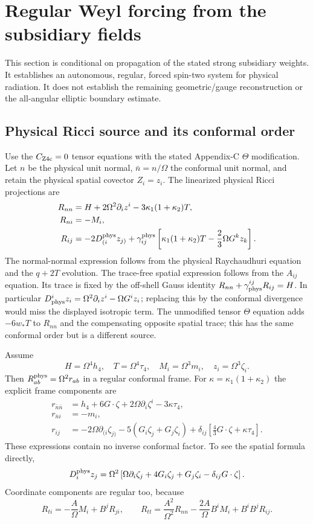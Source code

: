 \section{Regular Weyl forcing from the subsidiary fields}
\label{sec:weyl-source-energy}

This section is conditional on propagation of the stated strong subsidiary
weights.  It establishes an autonomous, regular, forced spin-two system for
physical radiation.  It does not establish the remaining geometric/gauge
reconstruction or the all-angular elliptic boundary estimate.

\subsection{Physical Ricci source and its conformal order}

Use the $C_{\rm Z4c}=0$ tensor equations with the stated Appendix-C
$\Theta$ modification.  Let $n$ be the physical unit normal, $\bar n=n/\Omega$
the conformal unit normal, and retain the physical spatial covector $Z_i=z_i$.
The linearized physical Ricci projections are
\begin{align}
 R_{nn}&=H+2\Omega^2\partial_i z^i
 -3\kappa_1(1+\kappa_2)T,\label{eq:weyl-ricci-nn}\\
 R_{ni}&=-M_i,\label{eq:weyl-ricci-ni}\\
 R_{ij}&=-2D^{\rm phys}_{(i}z_{j)}+
 \gamma^{\rm phys}_{ij}
 \left[\kappa_1(1+\kappa_2)T
 -\frac23\Omega G^kz_k\right].
 \label{eq:weyl-ricci-spatial}
\end{align}
The normal-normal expression follows from the physical Raychaudhuri equation
and the $q+2T$ evolution.  The trace-free spatial expression follows from the
$A_{ij}$ equation.  Its trace is fixed by the off-shell Gauss identity
$R_{nn}+\gamma_{\rm phys}^{ij}R_{ij}=H$.
In particular
$D^i_{\rm phys}z_i=\Omega^2\partial_i z^i-\Omega G^iz_i$;
replacing this by the conformal divergence would miss the displayed isotropic
term.  The unmodified tensor $\Theta$ equation adds $-6w_*T$ to
$R_{nn}$ and the compensating opposite spatial trace; this has the same
conformal order but is a different source.

Assume
\[
 H=\Omega^4h_4,\quad T=\Omega^4\tau_4,\quad
 M_i=\Omega^3m_i,\quad z_i=\Omega^3\zeta_i.
\]
Then $R_{ab}^{\rm phys}=\Omega^2r_{ab}$ in a regular conformal frame.
For $\kappa=\kappa_1(1+\kappa_2)$ the explicit frame components are
\begin{align*}
 r_{\bar n\bar n}&=h_4+6G\cdot\zeta+
 2\Omega\partial_i\zeta^i-3\kappa\tau_4,\\
 r_{\bar n i}&=-m_i,\\
 r_{ij}&=-2\Omega\partial_{(i}\zeta_{j)}
 -5(G_i\zeta_j+G_j\zeta_i)
 +\delta_{ij}\left[\frac43G\cdot\zeta+\kappa\tau_4\right].
\end{align*}
These expressions contain no inverse conformal factor.  To see the spatial
formula directly,
\[
 D^{\rm phys}_iz_j=\Omega^2\left[
 \Omega\partial_i\zeta_j+4G_i\zeta_j+G_j\zeta_i
 -\delta_{ij}G\cdot\zeta\right].
\]
Coordinate components are regular too, because
\[
 R_{ti}=-\frac{A}{\Omega}M_i+B^jR_{ji},\qquad
 R_{tt}=\frac{A^2}{\Omega^2}R_{nn}
 -\frac{2A}{\Omega}B^iM_i+B^iB^jR_{ij}.
\]

